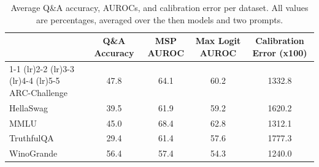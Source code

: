 \begin{table}[h]
\caption{Average Q\&A accuracy, AUROCs, and calibration error per dataset. All values are percentages, averaged over the then models and two prompts.}
\label{tab:dataset}
\centering
\begin{tabular}{lcccc}
\toprule
 & Q\&A Accuracy & MSP AUROC & Max Logit AUROC & Calibration Error (x100) \\ 
\cmidrule(lr){1-1} \cmidrule(lr){2-2} \cmidrule(lr){3-3} \cmidrule(lr){4-4} \cmidrule(lr){5-5}
ARC-Challenge & 47.8 & 64.1 & 60.2 & 1332.8\\
HellaSwag & 39.5 & 61.9 & 59.2 & 1620.2\\
MMLU & 45.0 & 68.4 & 62.8 & 1312.1\\
TruthfulQA & 29.4 & 61.4 & 57.6 & 1777.3\\
WinoGrande & 56.4 & 57.4 & 54.3 & 1240.0\\
\bottomrule
\end{tabular}
\end{table}
